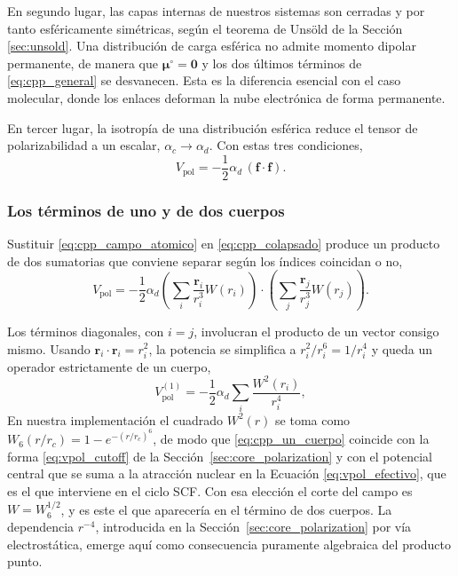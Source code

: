 En segundo lugar, las capas internas de nuestros sistemas son cerradas y por tanto esféricamente simétricas, según el teorema de Unsöld de la Sección \ref{sec:unsold}. Una distribución de carga esférica no admite momento dipolar permanente, de manera que $\bm{\mu}^{\circ} = \bm{0}$ y los dos últimos términos de \eqref{eq:cpp_general} se desvanecen. Esta es la diferencia esencial con el caso molecular, donde los enlaces deforman la nube electrónica de forma permanente.

En tercer lugar, la isotropía de una distribución esférica reduce el tensor de polarizabilidad a un escalar, $\alpha_c \to \alpha_d$. Con estas tres condiciones,
\begin{equation}
    \label{eq:cpp_colapsado}
    V_{\text{pol}} = -\frac{1}{2}\alpha_d \,(\bm{f}\cdot\bm{f}).
\end{equation}

\subsubsection{Los términos de uno y de dos cuerpos}

Sustituir \eqref{eq:cpp_campo_atomico} en \eqref{eq:cpp_colapsado} produce un producto de dos sumatorias que conviene separar según los índices coincidan o no,
\begin{equation}
    V_{\text{pol}} = -\frac{1}{2}\alpha_d \left( \sum_i \frac{\bm{r}_i}{r_i^3}W(r_i) \right)\cdot\left( \sum_j \frac{\bm{r}_j}{r_j^3}W(r_j) \right).
\end{equation}

Los términos diagonales, con $i=j$, involucran el producto de un vector consigo mismo. Usando $\bm{r}_i\cdot\bm{r}_i = r_i^2$, la potencia se simplifica a $r_i^2/r_i^6 = 1/r_i^4$ y queda un operador estrictamente de un cuerpo,
\begin{equation}
    \label{eq:cpp_un_cuerpo}
    V_{\text{pol}}^{(1)} = -\frac{1}{2}\alpha_d \sum_i \frac{W^2(r_i)}{r_i^4},
\end{equation}
En nuestra implementación el cuadrado $W^2(r)$ se toma como $W_6(r/r_c) = 1 - e^{-(r/r_c)^6}$, de modo que \eqref{eq:cpp_un_cuerpo} coincide con la forma \eqref{eq:vpol_cutoff} de la Sección~\ref{sec:core_polarization} y con el potencial central que se suma a la atracción nuclear en la Ecuación \eqref{eq:vpol_efectivo}, que es el que interviene en el ciclo SCF. Con esa elección el corte del campo es $W = W_6^{1/2}$, y es este el que aparecería en el término de dos cuerpos. La dependencia $r^{-4}$, introducida en la Sección~\ref{sec:core_polarization} por vía electrostática, emerge aquí como consecuencia puramente algebraica del producto punto.

